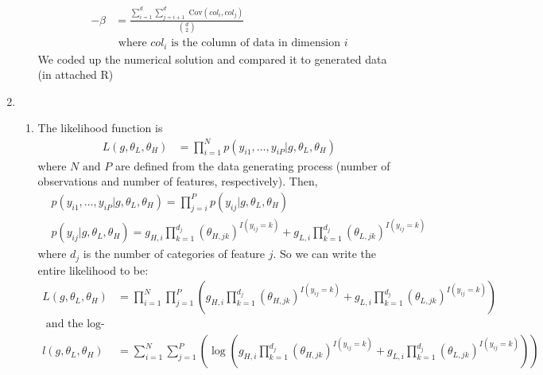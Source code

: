 \documentclass[paper=a4, fontsize=11pt]{scrartcl}
\newcommand{\parens}[1]{ \left( #1 \right) }
\begin{document}
\begin{enumerate}[1.]
\begin{enumerate}[1.]
        \begin{align*}
          -\beta &= \frac{
            \sum_{i=1}^{d}{
              \sum_{j=i+1}^{d}{
                \mbox{ Cov}(col_i, col_j) }
            }
          }{
            \binom{d}{2}
          } \\
          & \mbox{ where } col_i \mbox{ is the column of data in dimension } i
        \end{align*}
        We coded up the numerical solution and compared it to generated data (in attached R)
    \end{enumerate}
  \item
    \begin{enumerate}[1]
      \item The likelihood function is
        \begin{align*}
          L(g, \theta_L, \theta_H) &= \prod_{i = 1}^{N}{p(y_{i1},\ldots,y_{iP} | g, \theta_L, \theta_H)}
        \end{align*}
        where $N \text{ and } P$ are defined from the data generating process (number of observations and number of features, respectively). Then,
        \begin{align*}
          & p(y_{i1},\ldots,y_{iP} | g, \theta_L, \theta_H) = \prod_{j = i}^{P}{p(y_{ij} | g, \theta_L, \theta_H)} \\
          & p(y_{ij} | g, \theta_L, \theta_H) = g_{H,i} \prod_{k = 1}^{d_j}{(\theta_{H,jk})^{I(y_{ij} = k)}} + g_{L,i} \prod_{k = 1}^{d_j}{(\theta_{L,jk})^{I(y_{ij} = k)}}
        \end{align*}
        where $d_j$ is the number of categories of feature $j$. So we can write the entire likelihood to be: 
        \begin{align*}
          L(g, \theta_L, \theta_H) &=
            \prod_{i = 1}^{N}{\prod_{j = 1}^{P}{\parens{
                g_{H,i} \prod_{k = 1}^{d_j}{(\theta_{H,jk})^{I(y_{ij} = k)}} + g_{L,i} \prod_{k = 1}^{d_j}{(\theta_{L,jk})^{I(y_{ij} = k)}}
            }}} \\
          \text{ and the log-likelihood: } \\
          l(g, \theta_L, \theta_H) &=
            \sum_{i = 1}^{N} \sum_{j=1}^{P} \parens{\log{ \parens{
              g_{H,i} \prod_{k = 1}^{d_j}{(\theta_{H,jk})^{I(y_{ij} = k)}} + g_{L,i} \prod_{k = 1}^{d_j}{(\theta_{L,jk})^{I(y_{ij} = k)}} 
            }}}
        \end{align*}
    \end{enumerate}
\end{enumerate}
\end{document}

